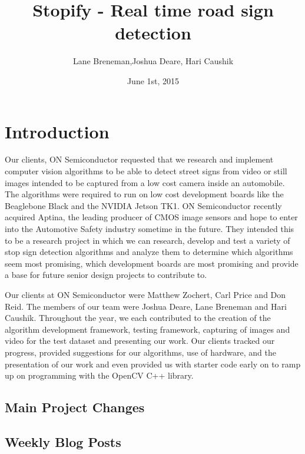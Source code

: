 \documentclass[letterpaper,10pt,titlepage]{article}
\title{Stopify - Real time road sign detection}
\date{June 1st, 2015}
\author{Lane Breneman,Joshua Deare, Hari Caushik}
\begin{document}
\maketitle

\section*{Introduction}
Our clients, ON Semiconductor requested that we research and implement computer
vision algorithms to be able to detect street signs from video or still images
intended to be captured from a low cost camera inside an automobile. The 
algorithms were required to run on low cost development boards like the 
Beaglebone Black and the NVIDIA Jetson TK1. ON Semiconductor recently acquired
Aptina, the leading producer of CMOS image sensors and hope to enter into the
Automotive Safety industry sometime in the future. They intended this to be a 
research project in which we can research, develop and test a variety of stop 
sign detection algorithms and analyze them to determine which algorithms seem
most promising, which development boards are most promising and provide a base 
for future senior design projects to contribute to.

Our clients at ON Semiconductor were Matthew Zochert, Carl Price and Don Reid.
The members of our team were Joshua Deare, Lane Breneman and Hari Caushik. 
Throughout the year, we each contributed to the creation of the algorithm 
development framework, testing framework, capturing of images and video for 
the test dataset and presenting our work. Our clients tracked our progress,
provided suggestions for our algorithms, use of hardware, and the presentation
of our work and even provided us with starter code early on to ramp up on 
programming with the OpenCV C++ library. 

\subsection*{Main Project Changes}

\subsection*{Weekly Blog Posts}
\end{document}
